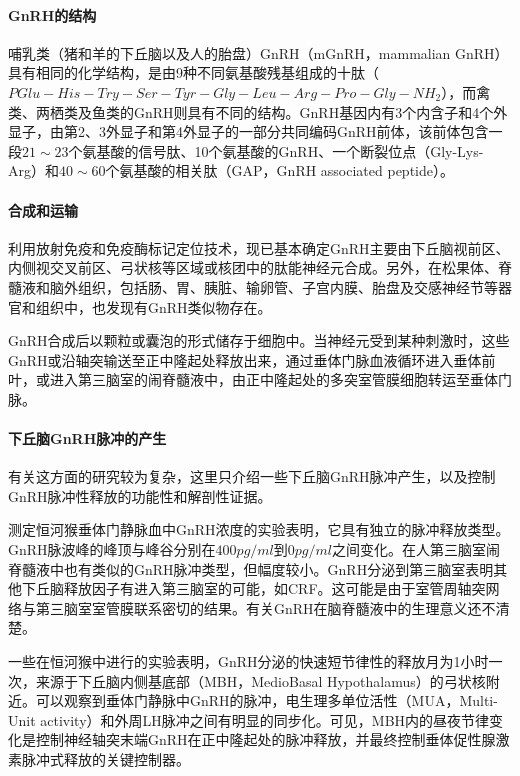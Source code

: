 \paragraph{GnRH的结构}

哺乳类（猪和羊的下丘脑以及人的胎盘）GnRH（mGnRH，mammalian GnRH）具有相同的化学结构，是由9种不同氨基酸残基组成的十肽（$ PGlu -His-Try-Ser-Tyr-Gly-Leu-Arg-Pro-Gly-NH_2 $），而禽类、两栖类及鱼类的GnRH则具有不同的结构。GnRH基因内有3个内含子和4个外显子，由第2、3外显子和第4外显子的一部分共同编码GnRH前体，该前体包含一段$ 21 \sim 23 $个氨基酸的信号肽、10个氨基酸的GnRH、一个断裂位点（Gly-Lys-Arg）和$ 40 \sim 60 $个氨基酸的相关肽（GAP，GnRH associated peptide）。

\paragraph{合成和运输}

利用放射免疫和免疫酶标记定位技术，现已基本确定GnRH主要由下丘脑视前区、内侧视交叉前区、弓状核等区域或核团中的肽能神经元合成。另外，在松果体、脊髓液和脑外组织，包括肠、胃、胰脏、输卵管、子宫内膜、胎盘及交感神经节等器官和组织中，也发现有GnRH类似物存在。

GnRH合成后以颗粒或囊泡的形式储存于细胞中。当神经元受到某种刺激时，这些GnRH或沿轴突输送至正中隆起处释放出来，通过垂体门脉血液循环进入垂体前叶，或进入第三脑室的闹脊髓液中，由正中隆起处的多突室管膜细胞转运至垂体门脉。

\paragraph{下丘脑GnRH脉冲的产生}

有关这方面的研究较为复杂，这里只介绍一些下丘脑GnRH脉冲产生，以及控制GnRH脉冲性释放的功能性和解剖性证据。

测定恒河猴垂体门静脉血中GnRH浓度的实验表明，它具有独立的脉冲释放类型。GnRH脉波峰的峰顶与峰谷分别在$ 400 pg/ml $到$ 0 pg/ml $之间变化。在人第三脑室闹脊髓液中也有类似的GnRH脉冲类型，但幅度较小。GnRH分泌到第三脑室表明其他下丘脑释放因子有进入第三脑室的可能，如CRF。这可能是由于室管周轴突网络与第三脑室室管膜联系密切的结果。有关GnRH在脑脊髓液中的生理意义还不清楚。

一些在恒河猴中进行的实验表明，GnRH分泌的快速短节律性的释放月为1小时一次，来源于下丘脑内侧基底部（MBH，MedioBasal Hypothalamus）的弓状核附近。可以观察到垂体门静脉中GnRH的脉冲，电生理多单位活性（MUA，Multi-Unit activity）和外周LH脉冲之间有明显的同步化。可见，MBH内的昼夜节律变化是控制神经轴突末端GnRH在正中隆起处的脉冲释放，并最终控制垂体促性腺激素脉冲式释放的关键控制器。

